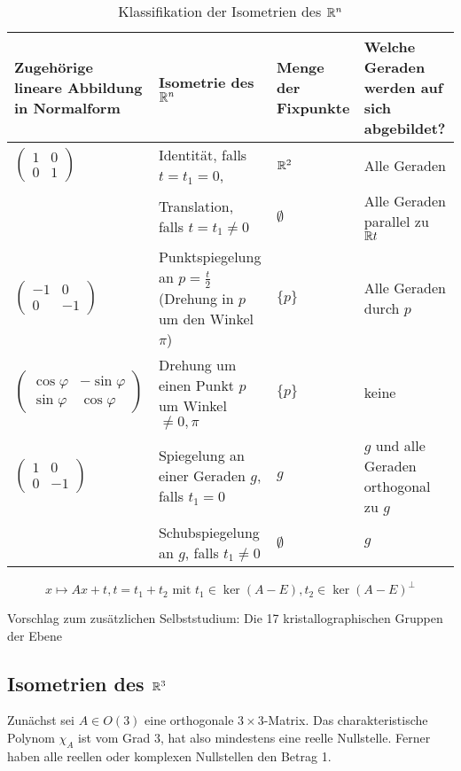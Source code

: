 \documentclass[
 a4paper,
 12pt,
 parskip=half
 ]{scrartcl}
\theoremstyle{plain}
\theoremstyle{definition}
\numberwithin{equation}{section}
\begin{document}
\begin{table}[ht]
 \center
 \begin{tabularx}{.95\textwidth}{|>{\center}m{3.5cm}|>{\center}m{3cm}|>{\center}m{3cm}|X|}
  \hline
  Zugehörige lineare Abbildung in Normalform & Isometrie des $\mathbb{R}^n$ & Menge der Fixpunkte & Welche Geraden werden auf sich abgebildet? \\
  \hline
  $\begin{pmatrix} 1 & 0 \\ 0 & 1 \end{pmatrix}$ &
  Identität, falls $t = t_1 = 0$, &
  $\mathbb{R}^2$ &
  Alle Geraden \\
   & Translation, falls $t = t_1 \ne 0$
   & $\emptyset$
   & Alle Geraden parallel zu $\mathbb{R} t$ \\  
  \hline
  $\begin{pmatrix} -1 & 0 \\ 0 & -1 \end{pmatrix}$ &
  Punktspiegelung an $p = \frac{t}{2}$ (Drehung in $p$ um den Winkel $\pi$) &
  $\{p\}$ &
  Alle Geraden durch $p$ \\
  \hline
  $\begin{pmatrix} \cos \varphi & - \sin \varphi \\ \sin \varphi & \cos \varphi \end{pmatrix}$ &
  Drehung um einen Punkt $p$ um Winkel $\ne 0, \pi$ &
  $\{p\}$ &
  keine \\
  \hline
  $\begin{pmatrix} 1 & 0 \\ 0 & -1 \end{pmatrix}$ &
  Spiegelung an einer Geraden $g$, falls $t_1 = 0$  &
  $g$ &
  $g$ und alle Geraden orthogonal zu $g$ \\
   & Schubspiegelung an $g$, falls $t_1 \ne 0$
   & $\emptyset$
   & $g$ \\
   \hline
 \end{tabularx}
 \[ x \mapsto Ax + t, t = t_1 + t_2 \text{ mit } t_1 \in \ker(A-E), t_2 \in \ker(A-E)^\bot \]
 \caption{Klassifikation der Isometrien des $\mathbb{R}^n$}
\end{table}

Vorschlag zum zusätzlichen Selbststudium: Die 17 kristallographischen Gruppen der Ebene

\subsection*{Isometrien des $\mathbb{R}^3$}
Zunächst sei $A \in O(3)$ eine orthogonale $3 \times 3$-Matrix. Das charakteristische Polynom $\chi_A$ ist vom Grad 3, hat also mindestens eine reelle Nullstelle. Ferner haben alle reellen oder komplexen Nullstellen den Betrag 1.
\end{document}
